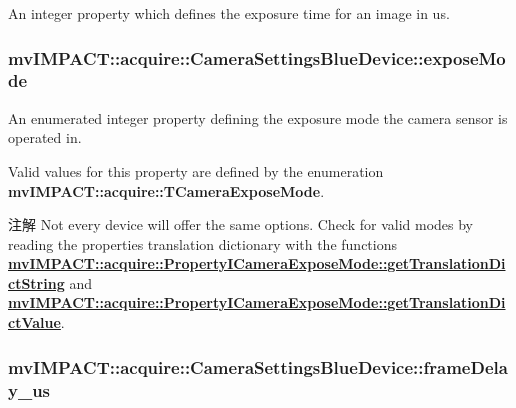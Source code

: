An integer property which defines the exposure time for an image in us. 

 \hypertarget{classmv_i_m_p_a_c_t_1_1acquire_1_1_camera_settings_blue_device_ac41f734868b019f40aad28839554c79a}{
\subsubsection[{expose\+Mode}]{ mv\+I\+M\+P\+A\+C\+T\+::acquire\+::\+Camera\+Settings\+Blue\+Device\+::expose\+Mode}}\label{classmv_i_m_p_a_c_t_1_1acquire_1_1_camera_settings_blue_device_ac41f734868b019f40aad28839554c79a}


An enumerated integer property defining the exposure mode the camera sensor is operated in. 

Valid values for this property are defined by the enumeration {\bfseries mv\+I\+M\+P\+A\+C\+T\+::acquire\+::\+T\+Camera\+Expose\+Mode}.

\begin{DoxyNote}{注解}
Not every device will offer the same options. Check for valid modes by reading the properties translation dictionary with the functions {\bfseries \hyperlink{classmv_i_m_p_a_c_t_1_1acquire_1_1_enum_property_i_af5ec5a9c3657af2917f4ead78ef067db}{mv\+I\+M\+P\+A\+C\+T\+::acquire\+::\+Property\+I\+Camera\+Expose\+Mode\+::get\+Translation\+Dict\+String}} and {\bfseries \hyperlink{classmv_i_m_p_a_c_t_1_1acquire_1_1_enum_property_i_a0c50700ebff2806621c63d03b624f200}{mv\+I\+M\+P\+A\+C\+T\+::acquire\+::\+Property\+I\+Camera\+Expose\+Mode\+::get\+Translation\+Dict\+Value}}. 
\end{DoxyNote}
\hypertarget{classmv_i_m_p_a_c_t_1_1acquire_1_1_camera_settings_blue_device_a73d838f2083f213c50ee6d2b161ad703}{
\subsubsection[{frame\+Delay\+\_\+us}]{ mv\+I\+M\+P\+A\+C\+T\+::acquire\+::\+Camera\+Settings\+Blue\+Device\+::frame\+Delay\+\_\+us}}\label{classmv_i_m_p_a_c_t_1_1acquire_1_1_camera_settings_blue_device_a73d838f2083f213c50ee6d2b161ad703}


